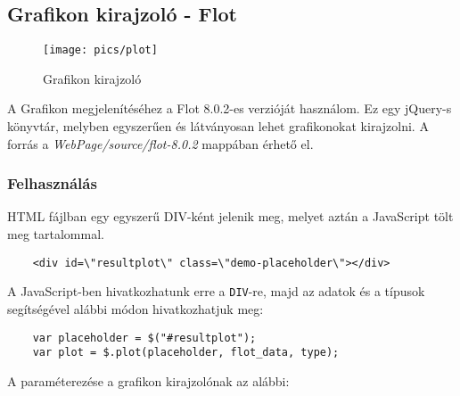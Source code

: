 \subsection{Grafikon kirajzoló - Flot}

	\begin{figure}[h]
	\texttt{[image: pics/plot]}
	\centering
	\caption{Grafikon kirajzoló\label{fig:plot}}
	\end{figure}
	
	A Grafikon megjelenítéséhez a Flot 8.0.2-es verzióját használom. Ez egy jQuery-s könyvtár, melyben egyszerűen és látványosan lehet grafikonokat kirajzolni. A forrás a \textit{WebPage/source/flot-8.0.2} mappában érhető el.
	\subsubsection{Felhasználás}
	HTML fájlban egy egyszerű DIV-ként jelenik meg, melyet aztán a JavaScript tölt meg tartalommal.
	\begin{verbatim}
	<div id=\"resultplot\" class=\"demo-placeholder\"></div>
	\end{verbatim}
	A JavaScript-ben hivatkozhatunk erre a \texttt{DIV}-re, majd az adatok és a típusok segítségével alábbi módon hivatkozhatjuk meg: 
	\begin{verbatim}
	var placeholder = $("#resultplot");
	var plot = $.plot(placeholder, flot_data, type);
	\end{verbatim}
	A paraméterezése a grafikon kirajzolónak az alábbi: 
